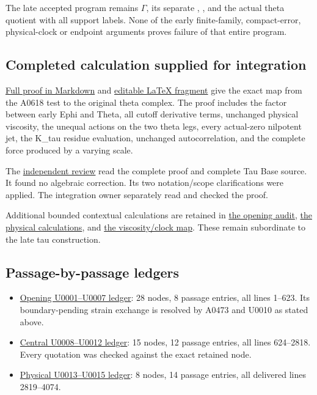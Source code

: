 \documentclass[10pt,a4paper,oneside]{report}
\providecommand{\tightlist}{\setlength{\itemsep}{0pt}\setlength{\parskip}{0pt}}
\begin{document}
The late accepted program remains
\protect{}\allowbreak{}\ensuremath{Γ}\allowbreak{}\protect{},
its separate \protect{}, \protect{}, and the
actual theta quotient with all support labels. None of the early
finite-family, compact-error, physical-clock or endpoint arguments
proves failure of that entire program.

\subsection{Completed calculation supplied for
integration}\label{completed-calculation-supplied-for-integration}

\href{NS_CUTOFF_THETA_SCALING.md}{Full proof in Markdown} and
\href{NS_CUTOFF_THETA_SCALING.tex}{editable LaTeX fragment} give the
exact map from the A0618 test to the original theta complex. The proof
includes the factor \protect{} between early Ephi and Theta, all
cutoff derivative terms, unchanged physical viscosity, the unequal
actions on the two theta legs, every actual-zero nilpotent jet, the
K\_tau residue evaluation, unchanged autocorrelation, and the complete
force produced by a varying scale.

The \href{physical_bridge/PARENT_SCALING_REVIEW.md}{independent review}
read the complete proof and complete Tau Base source. It found no
algebraic correction. Its two notation/scope clarifications were
applied. The integration owner separately read and checked the proof.

Additional bounded contextual calculations are retained in
\href{ns_context/opening_context_audit.md}{the opening audit},
\href{physical_bridge/CALCULATIONS.md}{the physical calculations}, and
\href{physical_bridge/VISCOSITY_MAP.md}{the viscosity/clock map}. These
remain subordinate to the late tau construction.

\subsection{Passage-by-passage
ledgers}\label{passage-by-passage-ledgers}

\begin{itemize}
\tightlist
\item
  \href{ns_context/opening_context_audit.md}{Opening U0001--U0007
  ledger}: 28 nodes, 8 passage entries, all lines 1--623. Its
  boundary-pending strain exchange is resolved by A0473 and U0010 as
  stated above.
\item
  \href{AUDIT_LOCAL.md}{Central U0008--U0012 ledger}: 15 nodes, 12
  passage entries, all lines 624--2818. Every quotation was checked
  against the exact retained node.
\item
  \href{physical_bridge/AUDIT.md}{Physical U0013--U0015 ledger}: 8
  nodes, 14 passage entries, all delivered lines 2819--4074.
\end{itemize}
\end{document}
